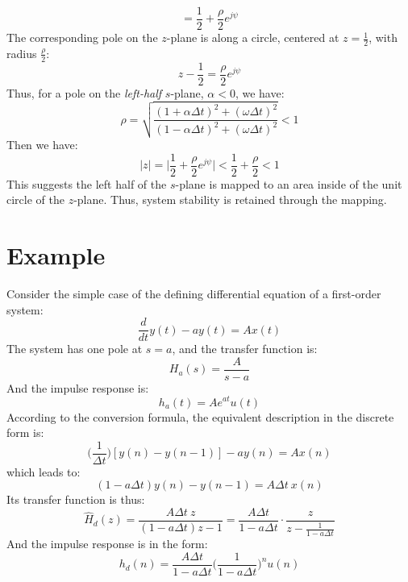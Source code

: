 \documentclass{article}
\begin{document}
\begin{enumerate}
\[    = \frac{1}{2} +\frac{\rho}{2}e^{j\psi}
    \]
    The corresponding pole on the \(z\)-plane is along a circle, centered at \(z=\frac{1}{2}\), with radius \(\frac{\rho}{2}\):
    \[
    z-\frac{1}{2}=\frac{\rho}{2}e^{j\psi}
    \]
    Thus, for a pole on the \textit{left-half} \(s\)-plane, \(\alpha<0\), we have:
    \[
    \rho=\sqrt{\frac{(1+\alpha\Delta t)^2+(\omega\Delta t)^2}{(1-\alpha\Delta t)^2+(\omega\Delta t)^2}}<1
    \]
    Then we have:
    \[
    |z|=\bigg|\frac{1}{2} +\frac{\rho}{2}e^{j\psi}\bigg|<\frac{1}{2}+\frac{\rho}{2}<1
    \]
    This suggests the left half of the \(s\)-plane is mapped to an area inside of the unit circle of the \(z\)-plane. Thus, system stability is retained through the mapping.
\end{enumerate}

\section{Example}
Consider the simple case of the defining differential equation of a first-order system:
\[
\frac{d}{dt}y(t)-ay(t)=Ax(t)
\]
The system has one pole at \(s=a\), and the transfer function is:
\[
H_a(s)=\frac{A}{s-a}
\]
And the impulse response is:
\[
h_a(t)=Ae^{at}u(t)
\]
According to the conversion formula, the equivalent description in the discrete form is:
\[
\bigg(\frac{1}{\Delta t}\bigg)[y(n)-y(n-1)]-ay(n)=Ax(n)
\]
which leads to:
\[
(1-a\Delta t)y(n)-y(n-1)=A\Delta t\ x(n)
\]
Its transfer function is thus:
\[
\hat{H}_d(z)=\frac{A\Delta t\ z}{(1-a\Delta t)z-1}=\frac{A\Delta t}{1-a\Delta t}\cdot\frac{z}{z-\frac{1}{1-a\Delta t}}
\]
And the impulse response is in the form:
\[
h_d(n)=\frac{A\Delta t}{1-a\Delta t}\bigg(\frac{1}{1-a\Delta t}\bigg)^nu(n)
\]
\newpage
\end{document}
